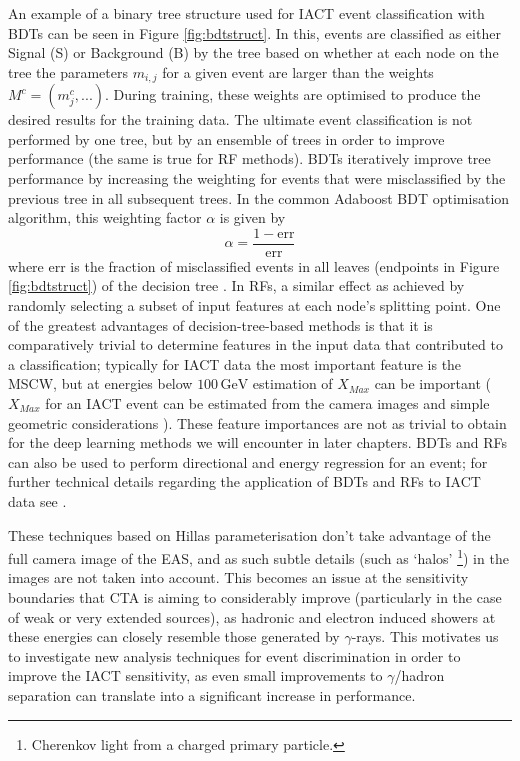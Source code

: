 An example of a binary tree structure used for IACT event classification with BDTs can be seen in Figure \ref{fig:bdtstruct}. In this, events are classified as either Signal (S) or Background (B) by the tree based on whether at each node on the tree the parameters $m_{i,j}$ for a given event are larger than the weights $M^c=(m^c_j,...)$. During training, these weights are optimised to produce the desired results for the training data. The ultimate event classification is not performed by one tree, but by an ensemble of trees in order to improve performance (the same is true for RF methods). BDTs iteratively improve tree performance by increasing the weighting for events that were misclassified by the previous tree in all subsequent trees. In the common Adaboost BDT optimisation algorithm, this weighting factor $\alpha$ is given by 
\begin{equation}
    \alpha=\frac{1-\mathrm{err}}{\mathrm{err}}
\end{equation}
where $\mathrm{err}$ is the fraction of misclassified events in all leaves (endpoints in Figure \ref{fig:bdtstruct}) of the decision tree \cite{hessbdt}. In RFs, a similar effect as achieved by randomly selecting a subset of input features at each node’s splitting point. One of the greatest advantages of decision-tree-based methods is that it is comparatively trivial to determine features in the input data that contributed to a classification; typically for IACT data the most important feature is the MSCW, but at energies below $\mathrm{100\,GeV}$ estimation of $X_{Max}$ can be important \cite{hessbdt} ($X_{Max}$ for an IACT event can be estimated from the camera images and simple geometric considerations \cite{Sitarek1i}). These feature importances are not as trivial to obtain for the deep learning methods we will encounter in later chapters. BDTs and RFs can also be used to perform directional and energy regression for an event; for further technical details regarding the application of BDTs and RFs to IACT data see \cite{Sitarek1i,magictime,hessbdt,supermagictime}.

These techniques based on Hillas parameterisation don't take advantage of the full camera image of the EAS, and as such subtle details (such as `halos' \cite{model++} \footnote{Cherenkov light from a charged primary particle.}) in the images are not taken into account. This becomes an issue at the sensitivity boundaries that CTA is aiming to considerably improve (particularly in the case of weak or very extended sources), as hadronic and electron induced showers at these energies can closely resemble those generated by $\gamma$-rays. This motivates us to investigate new analysis techniques for event discrimination in order to improve the IACT sensitivity, as even small improvements to $\gamma$/hadron separation can translate into a significant increase in performance.

